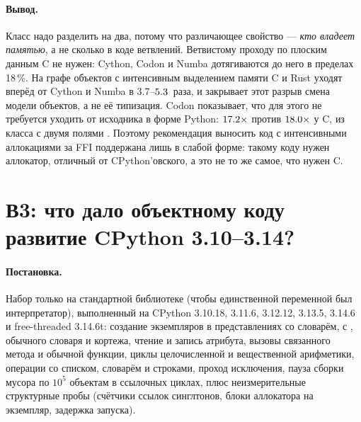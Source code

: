 \paragraph{Вывод.} Класс надо разделить на два, потому что различающее свойство --- \emph{кто
владеет памятью}, а не сколько в коде ветвлений. Ветвистому проходу по плоским данным C не нужен:
Cython, Codon и Numba дотягиваются до него в пределах 18\,\%. На графе объектов с интенсивным
выделением памяти C и Rust уходят вперёд от Cython и Numba в $3.7$--$\meas{ratio:b2_branchy-314:binarytrees/numba|b2_branchy-314:binarytrees/rust_ctypes}{5.3}$~раза, и закрывает этот
разрыв смена модели объектов, а не её типизация. Codon показывает, что для этого не требуется
уходить от исходника в форме Python: $\meas{ratio:b2_branchy-314:binarytrees/cpython_loop|b2_branchy-314:binarytrees/codon_pyext}{17.2}\times$ против $\meas{ratio:b2_branchy-314:binarytrees/cpython_loop|b2_branchy-314:binarytrees/c_ctypes}{18.0}\times$ у C, из класса с двумя
полями . Поэтому рекомендация выносить код с
интенсивными аллокациями за FFI поддержана лишь в слабой форме: такому коду нужен аллокатор,
отличный от CPython'овского, а это не то же самое, что нужен C.

\section{В3: что дало объектному коду развитие CPython 3.10--3.14?}
\label{sec:rq3}


\paragraph{Постановка.} Набор только на стандартной библиотеке (чтобы единственной переменной был
интерпретатор), выполненный на CPython 3.10.18, 3.11.6, 3.12.12, 3.13.5, 3.14.6 и free-threaded
3.14.6t: создание экземпляров в представлениях со словарём, с , обычного
словаря и кортежа, чтение и запись атрибута, вызовы связанного метода и обычной функции, циклы
целочисленной и вещественной арифметики, операции со списком, словарём и строками, проход
исключения, пауза сборки мусора по $10^5$ объектам в ссылочных циклах, плюс неизмерительные
структурные пробы (счётчики ссылок синглтонов, блоки аллокатора на экземпляр, задержка запуска).

